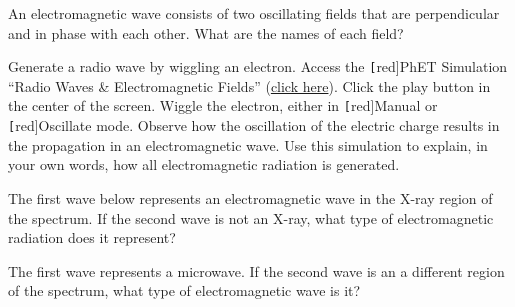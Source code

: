 \documentclass{article}
\numberwithin{equation}{section}
\numberwithin{figure}{section}
\begin{document}
\begin{exercise}
    An electromagnetic wave consists of two oscillating fields that are perpendicular and in phase with each other. What are the names of each field?
\end{exercise}

\begin{exercise}
    Generate a radio wave by wiggling an electron. Access the \texttt[red]{PhET Simulation} ``Radio Waves \& Electromagnetic Fields'' (\href{https://phet.colorado.edu/en/simulations/radio-waves}{click here}). Click the play button in the center of the screen. Wiggle the electron, either in \texttt[red]{Manual} or \texttt[red]{Oscillate} mode. Observe how the oscillation of the electric charge results in the propagation in an electromagnetic wave. Use this simulation to explain, in your own words, how all electromagnetic radiation is generated.
\end{exercise}

\begin{exercise}
    The first wave below represents an electromagnetic wave in the X-ray region of the spectrum. If the second wave is not an X-ray, what type of electromagnetic radiation does it represent?
\end{exercise}

\begin{center}
\end{center}

\begin{exercise}
    The first wave represents a microwave. If the second wave is an a different region of the spectrum, what type of electromagnetic wave is it?
\end{exercise}
\end{document}
